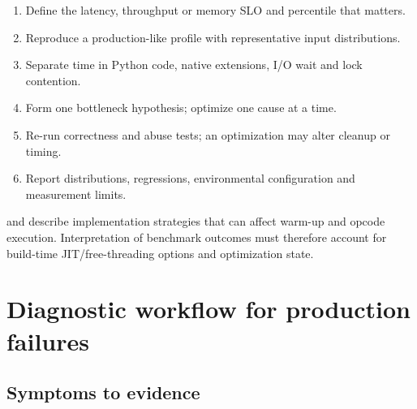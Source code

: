\documentclass[
  11pt,
]{report}
\providecommand{\tightlist}{%
  \setlength{\itemsep}{0pt}\setlength{\parskip}{0pt}}
\begin{document}
\begin{enumerate}
\def\labelenumi{\arabic{enumi}.}
\tightlist
\item
  Define the latency, throughput or memory SLO and percentile that
  matters.
\item
  Reproduce a production-like profile with representative input
  distributions.
\item
  Separate time in Python code, native extensions, I/O wait and lock
  contention.
\item
  Form one bottleneck hypothesis; optimize one cause at a time.
\item
  Re-run correctness and abuse tests; an optimization may alter cleanup
  or timing.
\item
  Report distributions, regressions, environmental configuration and
  measurement limits.
\end{enumerate}

 and
 describe
implementation strategies that can affect warm-up and opcode execution.
Interpretation of benchmark outcomes must therefore account for
build-time JIT/free-threading options and optimization state.

\chapter{Diagnostic workflow for production
failures}\label{diagnostic-workflow-for-production-failures}

\section{Symptoms to evidence}\label{symptoms-to-evidence}
\end{document}
